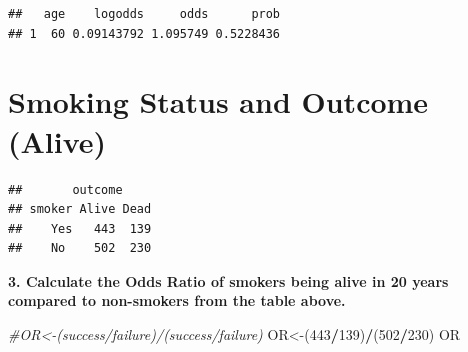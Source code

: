 \documentclass[]{article}
\newenvironment{Shaded}{\begin{snugshade}}{\end{snugshade}}
\newcommand{\CommentTok}[1]{\textcolor[rgb]{0.56,0.35,0.01}{\textit{#1}}}
\newcommand{\DataTypeTok}[1]{\textcolor[rgb]{0.13,0.29,0.53}{#1}}
\newcommand{\DecValTok}[1]{\textcolor[rgb]{0.00,0.00,0.81}{#1}}
\newcommand{\KeywordTok}[1]{\textcolor[rgb]{0.13,0.29,0.53}{\textbf{#1}}}
\newcommand{\NormalTok}[1]{#1}
\newcommand{\OperatorTok}[1]{\textcolor[rgb]{0.81,0.36,0.00}{\textbf{#1}}}
\newcommand{\OtherTok}[1]{\textcolor[rgb]{0.56,0.35,0.01}{#1}}
\newcommand{\StringTok}[1]{\textcolor[rgb]{0.31,0.60,0.02}{#1}}
\begin{document}
\begin{verbatim}
##   age    logodds     odds      prob
## 1  60 0.09143792 1.095749 0.5228436
\end{verbatim}

\vspace{0.25in}

\hypertarget{smoking-status-and-outcome-alive}{%
\section{Smoking Status and Outcome
(Alive)}\label{smoking-status-and-outcome-alive}}

\begin{Shaded}
\end{Shaded}

\begin{verbatim}
##       outcome
## smoker Alive Dead
##    Yes   443  139
##    No    502  230
\end{verbatim}

\vspace{0.25in}

\textbf{3. Calculate the Odds Ratio of smokers being alive in 20 years
compared to non-smokers from the table above.}

\begin{Shaded}
\begin{Highlighting}[]
\CommentTok{#OR<-(success/failure)/(success/failure)}
\NormalTok{OR<-(}\DecValTok{443}\OperatorTok{/}\DecValTok{139}\NormalTok{)}\OperatorTok{/}\NormalTok{(}\DecValTok{502}\OperatorTok{/}\DecValTok{230}\NormalTok{)}
\NormalTok{OR}
\end{Highlighting}
\end{Shaded}
\end{document}
